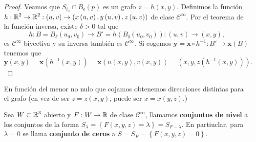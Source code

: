 \begin{proof}
Veamos que $\displaystyle S _{i_{0}}\cap B_{\epsilon}\left(p\right) $ es un grafo $\displaystyle z = h\left(x,y\right) $. 
Definimos la función $\displaystyle h : \mathbb{R}^{2} \to \mathbb{R}^{2} : \left(u,v\right)\to \left(x\left(u,v\right), y\left(u,v\right), z\left(u,v\right)\right) $ de clase $\displaystyle \mathcal{C}^{\infty } $. Por el teorema de la función inversa, existe $\displaystyle \delta > 0 $ tal que 
\[h : B =B_{\delta }\left(u_{0}, v_{0}\right) \to B' = h\left(B_{\delta }\left(u_{0}, v_{0}\right)\right) : \left(u,v\right)\to \left(x,y\right) ,\]
es $\displaystyle \mathcal{C}^{\infty } $ biyectiva y su inversa también es $\displaystyle \mathcal{C}^{\infty } $. Si cogemos $\displaystyle \textbf{y} = \textbf{x} \circ h^{-1} : B' \to \textbf{x} \left(B\right) $ tenemos que 
\[ \textbf{y} \left(x,y\right)= \textbf{x} \left(h^{-1}\left(x,y\right)\right) = \textbf{x} \left(u\left(x,y\right), v\left(x,y\right)\right) = \left(x,y, z\left(h^{-1}\left(x,y\right)\right)\right) .\]
\end{proof}
\begin{observation}
En función del menor no nulo que cojamos obtenemos direcciones distintas para el grafo (en vez de ser $\displaystyle z = z\left(x,y\right) $, puede ser $\displaystyle x = x\left(y,z\right) $.)
\end{observation}
\begin{definition}
	Sea $\displaystyle W \subset \mathbb{R}^{3} $ abierto y $\displaystyle F : W \to \mathbb{R} $ de clase $\displaystyle \mathcal{C}^{\infty } $, llamamos \textbf{conjuntos de nivel} a los conjuntos de la forma $\displaystyle S_{\lambda } = \left\{ F\left(x,y,z\right)=\lambda \right\} = S_{F-\lambda } $. En partiuclar, para $\displaystyle \lambda = 0 $ se llama \textbf{conjunto de ceros} a $\displaystyle S = S_{F} = \left\{ F\left(x,y,z\right)=0\right\}  $.
\end{definition}


